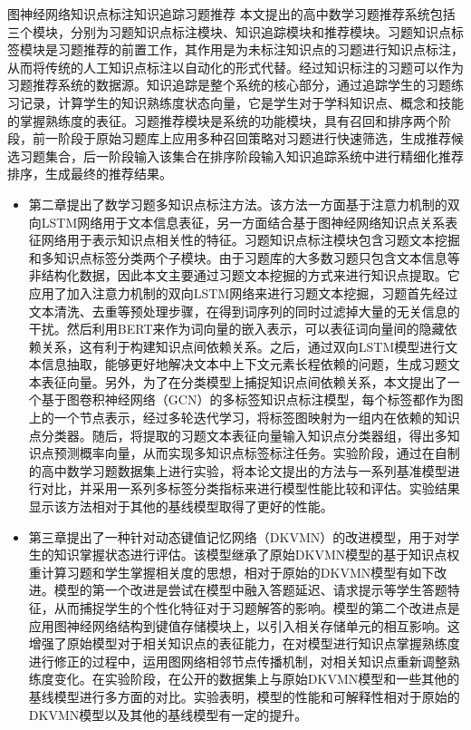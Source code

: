 \begin{abstractC}{图神经网络}{知识点标注}{知识追踪}{习题推荐}{}
    本文提出的高中数学习题推荐系统包括三个模块，分别为习题知识点标注模块、知识追踪模块和推荐模块。习题知识点标签模块是习题推荐的前置工作，其作用是为未标注知识点的习题进行知识点标注，从而将传统的人工知识点标注以自动化的形式代替。经过知识标注的习题可以作为习题推荐系统的数据源。知识追踪是整个系统的核心部分，通过追踪学生的习题练习记录，计算学生的知识熟练度状态向量，它是学生对于学科知识点、概念和技能的掌握熟练度的表征。习题推荐模块是系统的功能模块，具有召回和排序两个阶段，前一阶段于原始习题库上应用多种召回策略对习题进行快速筛选，生成推荐候选习题集合，后一阶段输入该集合在排序阶段输入知识追踪系统中进行精细化推荐排序，生成最终的推荐结果。
    \begin{itemize}
        \item 第二章提出了数学习题多知识点标注方法。该方法一方面基于注意力机制的双向LSTM网络用于文本信息表征，另一方面结合基于图神经网络知识点关系表征网络用于表示知识点相关性的特征。习题知识点标注模块包含习题文本挖掘和多知识点标签分类两个子模块。由于习题库的大多数习题只包含文本信息等非结构化数据，因此本文主要通过习题文本挖掘的方式来进行知识点提取。它应用了加入注意力机制的双向LSTM网络来进行习题文本挖掘，习题首先经过文本清洗、去重等预处理步骤，在得到词序列的同时过滤掉大量的无关信息的干扰。然后利用BERT来作为词向量的嵌入表示，可以表征词向量间的隐藏依赖关系，这有利于构建知识点间依赖关系。之后，通过双向LSTM模型进行文本信息抽取，能够更好地解决文本中上下文元素长程依赖的问题，生成习题文本表征向量。另外，为了在分类模型上捕捉知识点间依赖关系，本文提出了一个基于图卷积神经网络（GCN）的多标签知识点标注模型，每个标签都作为图上的一个节点表示，经过多轮迭代学习，将标签图映射为一组内在依赖的知识点分类器。随后，将提取的习题文本表征向量输入知识点分类器组，得出多知识点预测概率向量，从而实现多知识点标签标注任务。实验阶段，通过在自制的高中数学习题数据集上进行实验，将本论文提出的方法与一系列基准模型进行对比，并采用一系列多标签分类指标来进行模型性能比较和评估。实验结果显示该方法相对于其他的基线模型取得了更好的性能。
        \item 第三章提出了一种针对动态键值记忆网络（DKVMN）的改进模型，用于对学生的知识掌握状态进行评估。该模型继承了原始DKVMN模型的基于知识点权重计算习题和学生掌握相关度的思想，相对于原始的DKVMN模型有如下改进。模型的第一个改进是尝试在模型中融入答题延迟、请求提示等学生答题特征，从而捕捉学生的个性化特征对于习题解答的影响。模型的第二个改进点是应用图神经网络结构到键值存储模块上，以引入相关存储单元的相互影响。这增强了原始模型对于相关知识点的表征能力，在对模型进行知识点掌握熟练度进行修正的过程中，运用图网络相邻节点传播机制，对相关知识点重新调整熟练度变化。在实验阶段，在公开的数据集上与原始DKVMN模型和一些其他的基线模型进行多方面的对比。实验表明，模型的性能和可解释性相对于原始的DKVMN模型以及其他的基线模型有一定的提升。

\end{itemize}
\end{abstractC}
